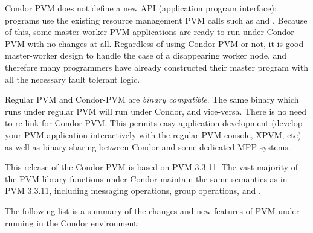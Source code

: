 Condor PVM does not define a new API (application program interface);
programs use the existing resource management PVM calls such
as  and .  Because of this, some
master-worker PVM applications are ready to run under Condor-PVM with no
changes at all.  Regardless of using Condor PVM or not, it is good
master-worker design to handle the case of a disappearing worker node,
and therefore many programmers have already constructed their master program
with all the necessary fault tolerant logic.

Regular PVM and Condor-PVM are \emph{binary compatible}.
The same binary which runs under regular PVM will run
under Condor, and vice-versa.  There is no need to re-link for Condor PVM.
This permits easy application development
(develop your PVM application interactively with the regular PVM console, XPVM,
etc) as well as binary sharing between Condor and some dedicated MPP systems.

This release of the Condor PVM is based on PVM 3.3.11.
The vast majority of the PVM
library functions under Condor maintain the same semantics as in
PVM 3.3.11, including messaging operations, group operations, and 
.

The following list
is a summary of the changes and new features of PVM under running in the
Condor environment:

